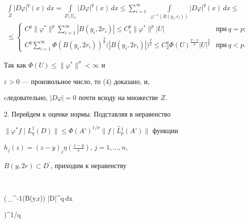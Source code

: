 \begin{multline*}


\int\limits_{Z}|D\varphi|^q(x)\,dx= \int\limits_{Z\setminus


\Sigma_{\varphi}}|D\varphi|^q(x)\,dx\leq


\sum_{i=1}^{\infty}\;\int\limits_{\varphi^{-1}(B(y_i,r_i))}


|D\varphi|^q(x)\,dx \le \\


\leq


\begin{cases}


C^p\|\varphi^*\|^p\sum\limits_{i=1}^{\infty}|B(y_i,2r_i)|\leq


C_1^p\|\varphi^*\|^p|U| &\text{при}\ q=p;\\


C^q\sum\limits_{i=1}^{\infty}\Phi(B(y_i,2r_i))^{\frac{q}{\sigma}}


\bigl(|B(y_i,2r_i)|\bigr)^{\frac{q}{p}} \leq


C_2^q\Phi(U)^{\frac{p-q}{p}} |U|^{\frac{q}{p}}


& \text{при}\ q<p.


\end{cases}


\end{multline*}





Так как $\Phi(U)\leq \|\varphi^{\ast}\|^{\sigma}<\infty$ и


$\varepsilon>0$ --- произвольное число, то (4) доказано, и,


cледовательно, $|D\varphi|=0$ почти всюду на множестве $Z$.





2. Перейдем к оценке нормы. Подставляя в неравенство


$\|\varphi^{\ast} f\mid{L}_{q}^{1}(D)\|


\leq\Phi(A')^{1/\sigma}


\|f\mid\overset{\circ}{L}{}_{p}^{1}(A')\|$ функции


$h_{j}(z)=(z-y)_{j}\eta(\frac{z-y}{r})$, $j=1,\dotsc,n$,


$B(y,2r)\subset D^{\prime}$, приходим к неравенству


$$


\bigg(\,\int\limits_{\varphi^{-1}(B(y,r))} |D\varphi|^q\,dx


\bigg)^{1/q} \leq


